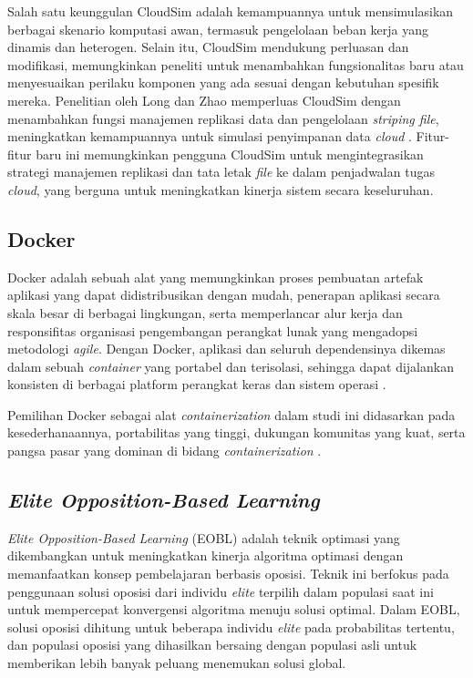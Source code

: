 Salah satu keunggulan CloudSim adalah kemampuannya untuk mensimulasikan berbagai skenario komputasi awan, termasuk pengelolaan beban kerja yang dinamis dan heterogen. Selain itu, CloudSim mendukung perluasan dan modifikasi, memungkinkan peneliti untuk menambahkan fungsionalitas baru atau menyesuaikan perilaku komponen yang ada sesuai dengan kebutuhan spesifik mereka. Penelitian oleh Long dan Zhao memperluas CloudSim dengan menambahkan fungsi manajemen replikasi data dan pengelolaan \textit{striping file}, meningkatkan kemampuannya untuk simulasi penyimpanan data \textit{cloud} \parencite{Long2012}. Fitur-fitur baru ini memungkinkan pengguna CloudSim untuk mengintegrasikan strategi manajemen replikasi dan tata letak \textit{file} ke dalam penjadwalan tugas \textit{cloud}, yang berguna untuk meningkatkan kinerja sistem secara keseluruhan.

\subsection{Docker}
Docker adalah sebuah alat yang memungkinkan proses pembuatan artefak aplikasi yang dapat didistribusikan dengan mudah, penerapan aplikasi secara skala besar di berbagai lingkungan, serta memperlancar alur kerja dan responsifitas organisasi pengembangan perangkat lunak yang mengadopsi metodologi \textit{agile}. Dengan Docker, aplikasi dan seluruh dependensinya dikemas dalam sebuah \textit{container} yang portabel dan terisolasi, sehingga dapat dijalankan konsisten di berbagai platform perangkat keras dan sistem operasi \parencite{Matthias2015}.

Pemilihan Docker sebagai alat \textit{containerization} dalam studi ini didasarkan pada kesederhanaannya, portabilitas yang tinggi, dukungan komunitas yang kuat, serta pangsa pasar yang dominan di bidang \textit{containerization} \parencite{Novotny2023}.

\subsection{\textit{Elite Opposition-Based Learning}}
\textit{Elite Opposition-Based Learning} (EOBL) adalah teknik optimasi yang dikembangkan untuk meningkatkan kinerja algoritma optimasi dengan memanfaatkan konsep pembelajaran berbasis oposisi. Teknik ini berfokus pada penggunaan solusi oposisi dari individu \textit{elite} terpilih dalam populasi saat ini untuk mempercepat konvergensi algoritma menuju solusi optimal. Dalam EOBL, solusi oposisi dihitung untuk beberapa individu \textit{elite} pada probabilitas tertentu, dan populasi oposisi yang dihasilkan bersaing dengan populasi asli untuk memberikan lebih banyak peluang menemukan solusi global\parencite{Rahnamayan2008}.

